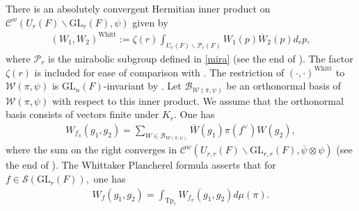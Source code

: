 \documentclass[12pt]{amsart}
\theoremstyle{remark}
\numberwithin{equation}{section}
\newcommand{\GL}{\mathrm{GL}}
\theoremstyle{definition}
\numberwithin{equation}{subsection}
\begin{document}
There is an absolutely convergent Hermitian inner product on $\mathcal{C}^w(U_r(F) \backslash \GL_r(F),\psi)$ given by 
\begin{align}\label{eq:Whitt}
    \left(W_1,W_2 \right)^{\mathrm{Whitt}}:=\zeta(r)\int_{U_r(F) \backslash \mathcal{P}_r(F)}W_1(p)\overline{W}_2(p)d_rp,
\end{align}
where $\mathcal{P}_r$ is the mirabolic subgroup defined in \eqref{mira}
(see the end of \cite[\S 2.8]{BP:GLn}).  The factor $\zeta(r)$ is included for ease of comparison with \cite[Proposition A.2]{FLO}.
The restriction of $(\cdot,\cdot)^{\mathrm{Whitt}}$ to $\mathcal{W}(\pi,\psi)$ is $\GL_n(F)$-invariant by
\cite{Baruch,Bernstein:P,Sahi}.
 Let $\mathcal{B}_{\mathcal{W}(\pi,\psi)}$ be an orthonormal basis of $\mathcal{W}(\pi,\psi)$ with respect to this inner product.  We assume that the orthonormal basis consists of vectors finite under $K_r.$ 
One has
\begin{align} \label{Whitt:exp}
    W_{f_{\pi}}(g_1,g_2)=\sum_{W \in \mathcal{B}_{\mathcal{W}(\pi,\psi)}}\overline{W}(g_1)\pi(f^\vee)W(g_2),
\end{align}
where the sum on the right converges in $\mathcal{C}^w(U_{r,r}(F) \backslash \GL_{r,r}(F),\overline{\psi} \otimes \psi)$
(see the end of \cite[\S 2.14]{BP:GLn}).
The Whittaker Plancherel formula \cite[Proposition 2.14.2]{BP:GLn} asserts that for $f \in \mathcal{S}(\GL_r(F)),$ one has
\begin{align} \label{Whitt:Planch}
    W_f(g_1,g_2)=\int_{\mathrm{Tp}_r}W_{f_\pi}(g_1,g_2) d\mu(\pi).
\end{align}

\end{document}
